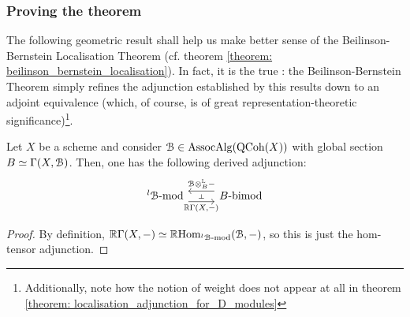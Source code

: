             \subsubsection{Proving the theorem}
                The following geometric result shall help us make better sense of the Beilinson-Bernstein Localisation Theorem (cf. theorem \ref{theorem: beilinson_bernstein_localisation}). In fact, it is the true : the Beilinson-Bernstein Theorem simply refines the adjunction established by this results down to an adjoint equivalence (which, of course, is of great representation-theoretic significance)\footnote{Additionally, note how the notion of weight does not appear at all in theorem \ref{theorem: localisation_adjunction_for_D_modules}}.
                
                \begin{lemma} \label{lemma: localisation_adjunction_for_quasi_coherent_associative_algebras}
                    Let $X$ be a scheme and consider $\mathcal{B} \in \mathrm{Assoc}\mathrm{Alg}(\mathrm{QCoh}(X))$ with global section $B \simeq \Gamma(X, \mathcal{B})$. Then, one has the following derived adjunction:
                        $$
                            \begin{tikzcd}
                            	{{}^l\calB\mod} & {B\bimod}
                            	\arrow[""{name=0, anchor=center, inner sep=0}, "{\R\Gamma(X, -)}"', shift right=2, from=1-1, to=1-2]
                            	\arrow[""{name=1, anchor=center, inner sep=0}, "{\calB \tensor_B^{\L} -}"', shift right=2, from=1-2, to=1-1]
                            	\arrow["\dashv"{anchor=center, rotate=-90}, draw=none, from=1, to=0]
                            \end{tikzcd}
                        $$
                \end{lemma}
                    \begin{proof}
                        By definition, $\mathbb{R}\Gamma(X, -) \simeq \mathbb{R}\mathrm{Hom}_{{}^l\mathcal{B}\text{-}\mathrm{mod}}(\mathcal{B}, -)$, so this is just the hom-tensor adjunction.
                    \end{proof}
